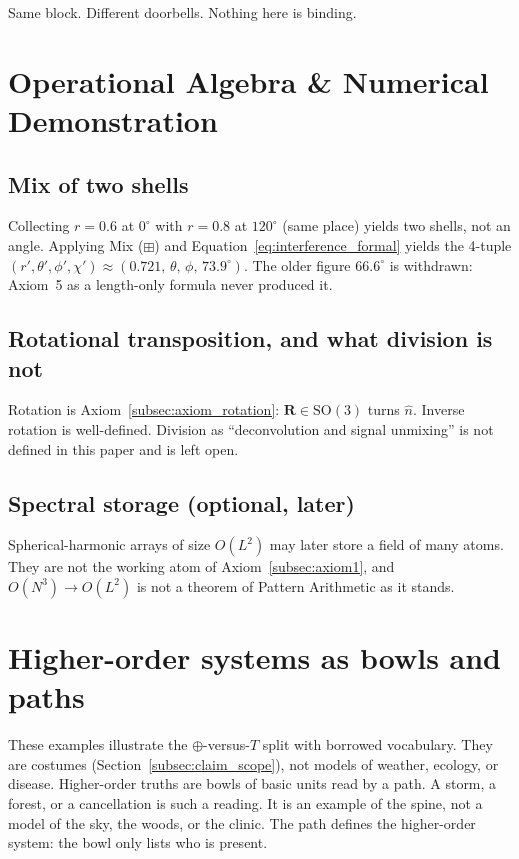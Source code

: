 \documentclass[12pt, a4paper]{article}
\begin{document}
Same block. Different doorbells. Nothing here is binding.

\section{Operational Algebra \& Numerical Demonstration}

\subsection{Mix of two shells}
Collecting $r=0.6$ at $0^\circ$ with $r=0.8$ at $120^\circ$ (same
place) yields two shells, not an angle. Applying Mix ($\boxplus$) and
Equation~\eqref{eq:interference_formal} yields the 4-tuple
$(r',\theta',\phi',\chi')\approx(0.721,\,\theta,\,\phi,\,73.9^\circ)$.
The older figure $66.6^\circ$ is withdrawn: Axiom~5 as a length-only
formula never produced it.

\subsection{Rotational transposition, and what division is not}
\label{subsec:division_open}
Rotation is Axiom~\ref{subsec:axiom_rotation}: $\mathbf{R}\in\mathrm{SO}(3)$
turns $\hat n$. Inverse rotation is well-defined. Division as
``deconvolution and signal unmixing'' is not defined in this paper and
is left open.

\subsection{Spectral storage (optional, later)}
Spherical-harmonic arrays of size $O(L^2)$ may later store a field of
many atoms. They are not the working atom of
Axiom~\ref{subsec:axiom1}, and $O(N^3)\to O(L^2)$ is not a theorem of
Pattern Arithmetic as it stands.

\section{Higher-order systems as bowls and paths}
\label{sec:higher_order}
These examples illustrate the $\oplus$-versus-$T$ split with borrowed
vocabulary. They are costumes
(Section~\ref{subsec:claim_scope}), not models of weather, ecology,
or disease.
Higher-order truths are bowls of basic units read by a path.
A storm, a forest, or a cancellation is such a reading.
It is an example of the spine, not a model of the sky, the woods,
or the clinic. The path defines the higher-order system: the bowl
only lists who is present.
\end{document}
